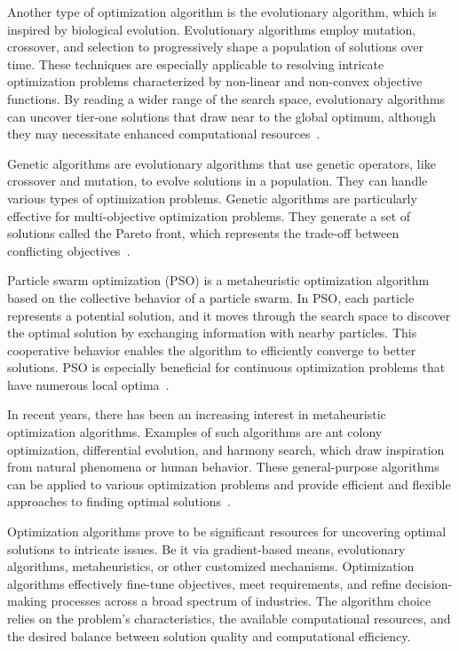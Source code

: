 Another type of optimization algorithm is the evolutionary algorithm, which is inspired by biological evolution. Evolutionary algorithms employ mutation, crossover, and selection to progressively shape a population of solutions over time. These techniques are especially applicable to resolving intricate optimization problems characterized by non-linear and non-convex objective functions. By reading a wider range of the search space, evolutionary algorithms can uncover tier-one solutions that draw near to the global optimum, although they may necessitate enhanced computational resources~\cite{Back.1993}.

Genetic algorithms are evolutionary algorithms that use genetic operators, like crossover and mutation, to evolve solutions in a population. They can handle various types of optimization problems. Genetic algorithms are particularly effective for multi-objective optimization problems. They generate a set of solutions called the Pareto front, which represents the trade-off between conflicting objectives~\cite{Lambora.2019,Katoch.2021}.

Particle swarm optimization (PSO) is a metaheuristic optimization algorithm based on the collective behavior of a particle swarm. In PSO, each particle represents a potential solution, and it moves through the search space to discover the optimal solution by exchanging information with nearby particles. This cooperative behavior enables the algorithm to efficiently converge to better solutions. PSO is especially beneficial for continuous optimization problems that have numerous local optima~\cite{Back.1993}.

In recent years, there has been an increasing interest in metaheuristic optimization algorithms. Examples of such algorithms are ant colony optimization, differential evolution, and harmony search, which draw inspiration from natural phenomena or human behavior. These general-purpose algorithms can be applied to various optimization problems and provide efficient and flexible approaches to finding optimal solutions~\cite{Yang.2011}.

Optimization algorithms prove to be significant resources for uncovering optimal solutions to intricate issues. Be it via gradient-based means, evolutionary algorithms, metaheuristics, or other customized mechanisms. Optimization algorithms effectively fine-tune objectives, meet requirements, and refine decision-making processes across a broad spectrum of industries. The algorithm choice relies on the problem's characteristics, the available computational resources, and the desired balance between solution quality and computational efficiency.


